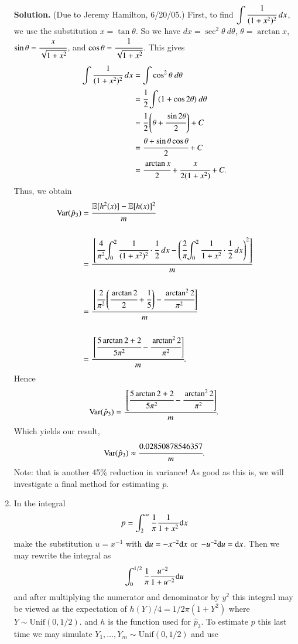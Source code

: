 \documentclass[captions=tableheading]{scrbook}
\begin{document}
\begin{enumerate}
   \textbf{Solution.} (Due to Jeremy Hamilton, 6/20/05.)
   First, to find ${\displaystyle \int\cfrac{1}{(1+x^{2})^{2}}\ dx}$, we use the substitution $x=\tan{\theta}$. So we have $dx=\sec^{2}{\theta}\ d\theta$, $\theta=\arctan{x}$, ${\displaystyle \sin{\theta}=\cfrac{x}{\sqrt{1+x^{2}}}}$, and ${\displaystyle \cos{\theta}=\cfrac{1}{\sqrt{1+x^{2}}}}$. This gives 
   \begin{align*}
   \int\cfrac{1}{(1+x^{2})^{2}}\ dx & =\int\cos^{2}{\theta}\ d\theta\\
   & =\cfrac{1}{2}\int(1+\cos{2\theta})\ d\theta\\
   & =\cfrac{1}{2}\left(\theta+\cfrac{\sin{2\theta}}{2}\right)+C\\
   & =\cfrac{\theta+\sin{\theta}\cos{\theta}}{2}+C\\
   & =\cfrac{\arctan{x}}{2}+\cfrac{x}{2(1+x^{2})}+C.
   \end{align*}
   Thus, we obtain
   \begin{align*}
   \text{Var}(\hat{p}_{3}) & =\cfrac{\mathbb{E}[h^{2}(x)]-\mathbb{E}[h(x)]^{2}}{m}\\
   \\ & =\cfrac{\left[\cfrac{4}{\pi^{2}}{\displaystyle \int_{0}^{2}\cfrac{1}{(1+x^{2})^{2}}\cdot\cfrac{1}{2}\ dx}-\left(\cfrac{2}{\pi}{\displaystyle \int_{0}^{2}\cfrac{1}{1+x^{2}}\cdot\cfrac{1}{2}\ dx}\right)^{2}\right]}{m}\\
   \\ & =\cfrac{\left[\cfrac{2}{\pi^{2}}\left(\cfrac{\arctan{2}}{2}+\cfrac{1}{5}\right)-\cfrac{\arctan^{2}{2}}{\pi^{2}}\right]}{m}\\
   \\ & =\cfrac{\left[\cfrac{5\arctan{2}+2}{5\pi^{2}}-\cfrac{\arctan^{2}{2}}{\pi^{2}}\right]}{m}.
   \end{align*}
   Hence
   \[
   \text{Var}(\hat{p}_{3})=\cfrac{\left[\cfrac{5\arctan{2}+2}{5\pi^{2}}-\cfrac{\arctan^{2}{2}}{\pi^{2}}\right]}{m}.
   \]
   Which yields our result,
   \[
   \text{Var}(\hat{p}_{3})\approx\cfrac{0.02850878546357}{m}.
   \]
   Note: that is another 45\% reduction in variance! As good as this is, we will investigate a final method for estimating $p$.
\item In the integral 
  \[
  p=\int_{2}^{\infty}\frac{1}{\pi}\frac{1}{1+x^{2}}\mathrm{d} x
  \]
  make the substitution $u=x^{-1}$ with $\mathrm{d} u=-x^{-2}\mathrm{d} x$ or $-u^{-2}\mathrm{d} u=\mathrm{d} x$.
  Then we may rewrite the integral as 
  \[
  \int_{0}^{1/2}\frac{1}{\pi}\frac{u^{-2}}{1+u^{-2}}\mathrm{d} u
  \]
  and after multiplying the numerator and denominator by $y^{2}$ this integral may be viewed as the expectation of $h(Y)/4=1/2\pi(1+Y^{2})$ where $Y\sim\mathrm{Unif}(0,1/2)$. and $h$ is the function used for $\hat{p}_{3}$. To estimate $p$ this last time we may simulate $Y_{1},\ldots,Y_{m}\sim\mathrm{Unif}(0,1/2)$ and use

\end{enumerate}
\end{document}
